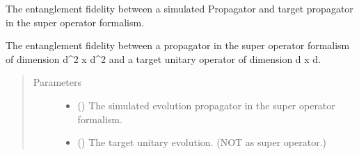 \documentclass[letterpaper,10pt,english]{sphinxmanual}
\begin{document}
\begin{fulllineitems}
\label{\detokenize{qsim:qsim.cost_functions.entanglement_fidelity_super_operator}}
The entanglement fidelity between a simulated Propagator and target
propagator in the super operator formalism.

The entanglement fidelity between a propagator in the super operator
formalism of dimension d\textasciicircum{}2 x d\textasciicircum{}2 and a target unitary operator of dimension
d x d.
\begin{quote}\begin{description}
\item[{Parameters}] \leavevmode\begin{itemize}
\item {} 
 (\sphinxstyleliteralemphasis{\sphinxupquote{{[}}}\sphinxstyleliteralemphasis{\sphinxupquote{, }}\sphinxstyleliteralemphasis{\sphinxupquote{{]}}}) \textendash{} The simulated evolution propagator in the super operator formalism.

\item {} 
 (\sphinxstyleliteralemphasis{\sphinxupquote{{[}}}\sphinxstyleliteralemphasis{\sphinxupquote{, }}\sphinxstyleliteralemphasis{\sphinxupquote{{]}}}) \textendash{} The target unitary evolution. (NOT as super operator.)


\end{itemize}
\end{description}
\end{quote}
\end{fulllineitems}
\end{document}
